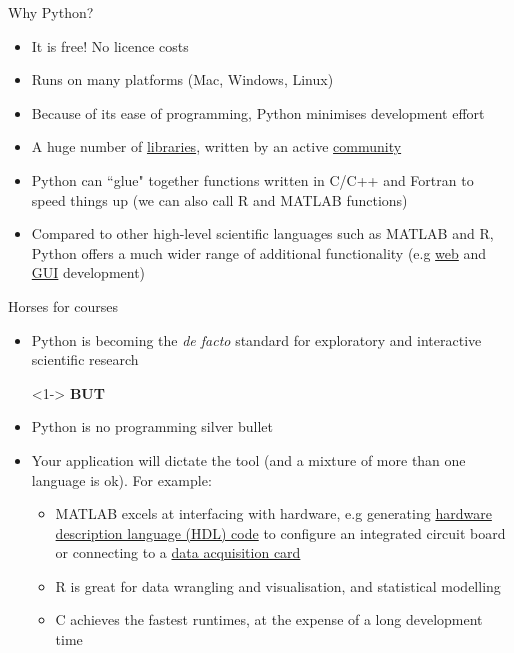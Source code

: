 \documentclass[xcolor=table]{beamer}
\begin{document}
\begin{frame}{Why Python?}

\begin{itemize}\addtolength{\itemsep}{0.5\baselineskip}
	\item<1-> It is free! No licence costs
	\item<2-> Runs on many platforms (Mac, Windows, Linux)
	\item<3-> Because of its ease of programming, Python minimises development effort
	\item<4-> A huge number of \href{https://pypi.python.org/pypi}{libraries}, written by an active \href{https://www.python.org/community/}{community}  
	\item<5-> Python can ``glue" together functions written in C/C++ and Fortran to speed things up (we can also call R and MATLAB functions)
	\item<6-> Compared to other high-level scientific languages such as MATLAB and R, Python offers a much wider range of additional functionality (e.g \href{https://www.djangoproject.com/}{web} and \href{https://wiki.python.org/moin/TkInter}{GUI} development) %
\end{itemize}

\end{frame}

\begin{frame}{Horses for courses}

\begin{itemize}\addtolength{\itemsep}{0.5\baselineskip}
        \item<1-> Python is becoming the \emph{de facto} standard for exploratory and interactive scientific research\\
	\item[]<1-> \textbf{BUT}
	\item<2-> Python is no programming silver bullet
	\item<3-> Your application will dictate the tool (and a mixture of more than one language is ok). For example:\\
	\begin{itemize}\addtolength{\itemsep}{0.8\baselineskip}
		\item<4-> MATLAB excels at interfacing with hardware, e.g generating \href{https://uk.mathworks.com/products/hdl-coder.html}{hardware description language (HDL) code} to configure an integrated circuit board or connecting to a \href{https://uk.mathworks.com/products/daq.html}{data acquisition card}
		\item<5-> R is great for data wrangling and visualisation, and statistical modelling
        \item<6-> C achieves the fastest runtimes, at the expense of a long development time
	\end{itemize}
\end{itemize}

\end{frame}
\end{document}
